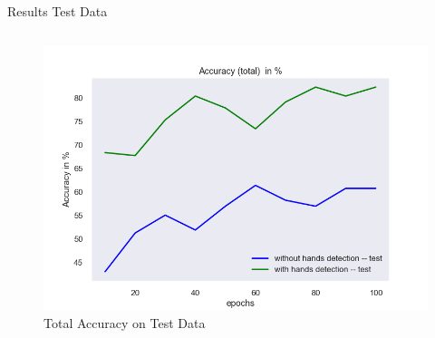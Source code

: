 \documentclass[aspectratio=169]{beamer}
\begin{document}
{\begin{frame}{Results Test Data}
\begin{columns}
    \begin{figure}
        \centering
        \includegraphics[width=1\textwidth]{img/experiment/model_comp_10steps__test_acc_total.png}
        \caption{Total Accuracy on Test Data}
    \end{figure}      


\end{columns}
\end{frame}}
\end{document}
